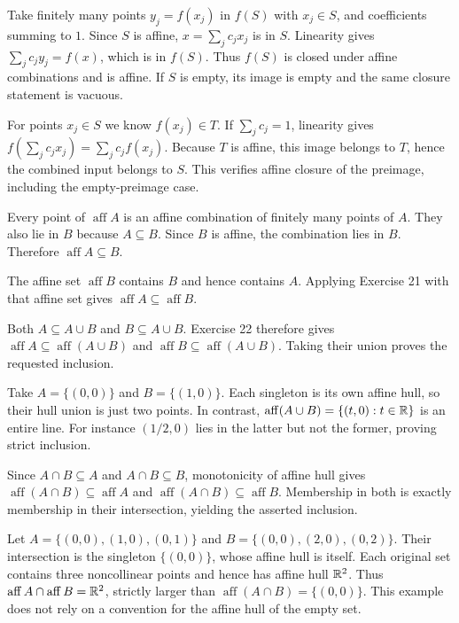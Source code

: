 Take finitely many points $y_j=f(x_j)$ in $f(S)$ with $x_j\in S$, and coefficients summing to $1$. Since $S$ is affine, $x=\sum_jc_jx_j$ is in $S$. Linearity gives $\sum_jc_jy_j=f(x)$, which is in $f(S)$. Thus $f(S)$ is closed under affine combinations and is affine. If $S$ is empty, its image is empty and the same closure statement is vacuous.

For points $x_j\in S$ we know $f(x_j)\in T$. If $\sum_jc_j=1$, linearity gives $f(\sum_jc_jx_j)=\sum_jc_jf(x_j)$. Because $T$ is affine, this image belongs to $T$, hence the combined input belongs to $S$. This verifies affine closure of the preimage, including the empty-preimage case.

Every point of $\operatorname{aff}A$ is an affine combination of finitely many points of $A$. They also lie in $B$ because $A\subseteq B$. Since $B$ is affine, the combination lies in $B$. Therefore $\operatorname{aff}A\subseteq B$.

The affine set $\operatorname{aff}B$ contains $B$ and hence contains $A$. Applying Exercise 21 with that affine set gives $\operatorname{aff}A\subseteq\operatorname{aff}B$.

Both $A\subseteq A\cup B$ and $B\subseteq A\cup B$. Exercise 22 therefore gives $\operatorname{aff}A\subseteq\operatorname{aff}(A\cup B)$ and $\operatorname{aff}B\subseteq\operatorname{aff}(A\cup B)$. Taking their union proves the requested inclusion.

Take $A=\{(0,0)\}$ and $B=\{(1,0)\}$. Each singleton is its own affine hull, so their hull union is just two points. In contrast, $\operatorname{aff}(A\cup B)=\{(t,0):t\in\mathbb{R}\}$ is an entire line. For instance $(1/2,0)$ lies in the latter but not the former, proving strict inclusion.

Since $A\cap B\subseteq A$ and $A\cap B\subseteq B$, monotonicity of affine hull gives $\operatorname{aff}(A\cap B)\subseteq\operatorname{aff}A$ and $\operatorname{aff}(A\cap B)\subseteq\operatorname{aff}B$. Membership in both is exactly membership in their intersection, yielding the asserted inclusion.

Let $A=\{(0,0),(1,0),(0,1)\}$ and $B=\{(0,0),(2,0),(0,2)\}$. Their intersection is the singleton $\{(0,0)\}$, whose affine hull is itself. Each original set contains three noncollinear points and hence has affine hull $\mathbb{R}^2$. Thus $\operatorname{aff}A\cap\operatorname{aff}B=\mathbb{R}^2$, strictly larger than $\operatorname{aff}(A\cap B)=\{(0,0)\}$. This example does not rely on a convention for the affine hull of the empty set.
